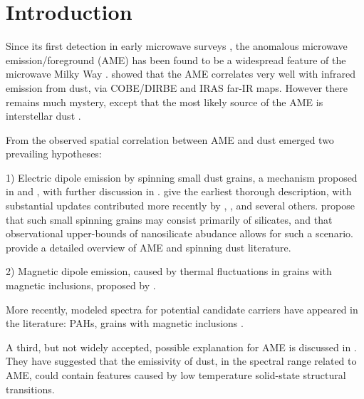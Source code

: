 \documentclass[preprint2,longabstract]{aastex}
\begin{document}


\maketitle

\section{Introduction}

     Since its first detection in early microwave surveys , the anomalous microwave emission/foreground (AME) has been found to be a widespread feature of the microwave Milky Way \citep{dickinson13r}. \cite{kogut96,deoliveiracosta97,leitch98} showed that the AME correlates very well with infrared emission from dust, via COBE/DIRBE and IRAS far-IR maps. However there remains much mystery, except that the most likely source of the AME is interstellar dust \citep{ysard10a,tibbs11,hensley16}.

     From the observed spatial correlation between AME and dust emerged two prevailing hypotheses:

     1) Electric dipole emission by spinning small dust grains, a mechanism proposed in \cite{erickson57} and \cite{hoyle70}, with further discussion in \cite{ferrara94}. \cite{draine98b} give the earliest thorough description, with substantial updates contributed more recently by \cite{ysard10a}, \cite{ali-haimoud09}, \cite{hoang10} and several others. \cite{henlsey17} propose that such small spinning grains may consist primarily of silicates, and that observational upper-bounds of nanosilicate abudance allows for such a scenario. \cite{dickinson13r} provide a detailed overview of AME and spinning dust literature.

     2) Magnetic dipole emission, caused by thermal fluctuations in grains with magnetic inclusions, proposed by \cite{draine99}.

     More recently, modeled spectra for potential candidate carriers have appeared in the literature: PAHs, grains with magnetic inclusions \citep{draine13, ali-haimoud14, hoang16a}.

    A third, but not widely accepted, possible explanation for AME is discussed in \cite{jones09}. They have suggested that the emissivity of dust, in the spectral range related to AME, could contain features caused by low temperature solid-state structural transitions.
\end{document}
